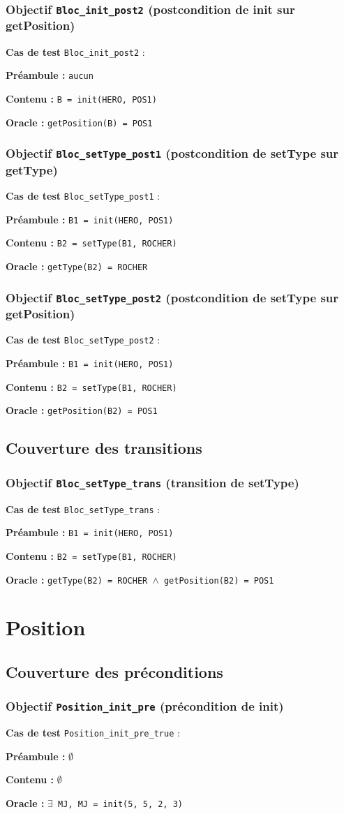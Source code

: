 \documentclass{article}
\newcommand{\cmd}[1]{\texttt{#1}}
\newcommand{\lAND}{$\land$}
\newcommand{\lEXISTS}{$\exists$}
\newcommand{\obj}[2]{\subsubsection*{\large{\textbf{Objectif {\cmd{#1} (#2)}}}}}
\newenvironment{cas}[1]
{
	\hspace{1em}\textbf{Cas de test} \cmd{#1} :
	\begin{list}{}{}
}{
	\end{list}\vspace{1em}
}
\newcommand{\pre}[1]{\item \textbf{Préambule :} \cmd{#1}}
\newcommand{\npre}{\item \textbf{Préambule :} $\emptyset$}
\newcommand{\ope}[1]{\item \textbf{Contenu :} \cmd{#1}}
\newcommand{\nope}{\item \textbf{Contenu :} $\emptyset$}
\newcommand{\ora}[1]{\item \textbf{Oracle :} \cmd{#1}}
\begin{document}
\obj{Bloc\_init\_post2} {postcondition de init sur getPosition}
	\begin{cas}{Bloc\_init\_post2}
		\pre{aucun}
		\ope{B = init(HERO, POS1)}
		\ora{getPosition(B) = POS1}
	\end{cas}

\obj{Bloc\_setType\_post1} {postcondition de setType sur getType}
	\begin{cas}{Bloc\_setType\_post1}
		\pre{B1 = init(HERO, POS1)}
		\ope{B2 = setType(B1, ROCHER)}
		\ora{getType(B2) = ROCHER}
	\end{cas}


\obj{Bloc\_setType\_post2} {postcondition de setType sur getPosition}
	\begin{cas}{Bloc\_setType\_post2}
		\pre{B1 = init(HERO, POS1)}
		\ope{B2 = setType(B1, ROCHER)}
		\ora{getPosition(B2) = POS1}
	\end{cas}


\subsection{Couverture des transitions}

\obj{Bloc\_setType\_trans} {transition de setType}
	\begin{cas}{Bloc\_setType\_trans}
		\pre{B1 = init(HERO, POS1)}
		\ope{B2 = setType(B1, ROCHER)}
		\ora{getType(B2) = ROCHER \lAND{} getPosition(B2) = POS1}
	\end{cas}

\clearpage{}





















\section{Position}

\subsection{Couverture des préconditions}

\obj{Position\_init\_pre} {précondition de init}

	\begin{cas}{Position\_init\_pre\_true}
		\npre{}
		\nope{}
		\ora{\lEXISTS{} MJ, MJ = init(5, 5, 2, 3)}
	\end{cas}
\end{document}
